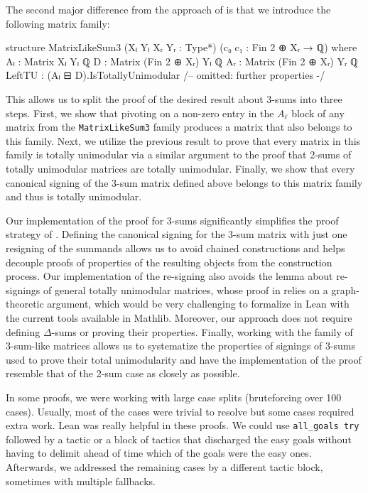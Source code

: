The second major difference from the approach of \cite{Truemper2016} is that we introduce the following matrix family:
\begin{leancode}
structure MatrixLikeSum3
    (Xₗ Yₗ Xᵣ Yᵣ : Type*)
    (c₀ c₁ : Fin 2 ⊕ Xᵣ → ℚ) where
  Aₗ : Matrix Xₗ Yₗ ℚ
  D  : Matrix (Fin 2 ⊕ Xᵣ) Yₗ ℚ
  Aᵣ : Matrix (Fin 2 ⊕ Xᵣ) Yᵣ ℚ
  LeftTU : (Aₗ ⊟ D).IsTotallyUnimodular
  /-- omitted: further properties -/
\end{leancode}
This allows us to split the proof of the desired result about 3-sums into three steps. First, we show that pivoting on a non-zero entry in the $A_{\ell}$ block of any matrix from the \texttt{MatrixLikeSum3} family produces a matrix that also belongs to this family. Next, we utilize the previous result to prove that every matrix in this family is totally unimodular via a similar argument to the proof that 2-sums of totally unimodular matrices are totally unimodular. Finally, we show that every canonical signing of the 3-sum matrix defined above belongs to this matrix family and thus is totally unimodular.

Our implementation of the proof for 3-sums significantly simplifies the proof strategy of \cite{Truemper2016}. Defining the canonical signing for the 3-sum matrix with just one resigning of the summands allows us to avoid chained constructions and helps decouple proofs of properties of the resulting objects from the construction process. Our implementation of the re-signing also avoids the lemma about re-signings of general totally unimodular matrices, whose proof in \cite{Truemper2016} relies on a graph-theoretic argument, which would be very challenging to formalize in Lean with the current tools available in Mathlib. Moreover, our approach does not require defining $\Delta$-sums or proving their properties. Finally, working with the family of 3-sum-like matrices allows us to systematize the properties of signings of 3-sums used to prove their total unimodularity and have the implementation of the proof resemble that of the 2-sum case as closely as possible.

In some proofs, we were working with large case splits (bruteforcing over 100 cases).
Usually, most of the cases were trivial to resolve but some cases required extra work.
Lean was really helpful in these proofs.
We could use \texttt{all\_goals try} followed by a tactic or a block of tactics that discharged the easy goals
without having to delimit ahead of time which of the goals were the easy ones.
Afterwards, we addressed the remaining cases by a different tactic block, sometimes with multiple fallbacks.
